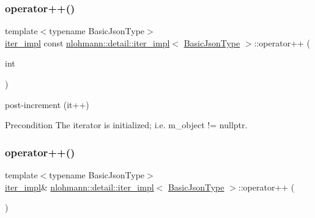 \subsubsection{\texorpdfstring{operator++()}{operator++()}\hspace{0.1cm}{\footnotesize\ttfamily [1/2]}}
{\footnotesize\ttfamily template$<$typename Basic\+Json\+Type$>$ \\
\hyperlink{classnlohmann_1_1detail_1_1iter__impl}{iter\+\_\+impl} const \hyperlink{classnlohmann_1_1detail_1_1iter__impl}{nlohmann\+::detail\+::iter\+\_\+impl}$<$ \hyperlink{classnlohmann_1_1detail_1_1iter__impl_abf18f18793f84b0222aebb5a2a87da7a}{Basic\+Json\+Type} $>$\+::operator++ (\begin{DoxyParamCaption}\item[{int}]{ }\end{DoxyParamCaption})\hspace{0.3cm}{\ttfamily [inline]}}



post-\/increment (it++) 

\begin{DoxyPrecond}{Precondition}
The iterator is initialized; i.\+e. {\ttfamily m\+\_\+object != nullptr}. 
\end{DoxyPrecond}
\mbox{\label{classnlohmann_1_1detail_1_1iter__impl_abdfe2a7f464400a7ab572782d14b922f}} 
\subsubsection{\texorpdfstring{operator++()}{operator++()}\hspace{0.1cm}{\footnotesize\ttfamily [2/2]}}
{\footnotesize\ttfamily template$<$typename Basic\+Json\+Type$>$ \\
\hyperlink{classnlohmann_1_1detail_1_1iter__impl}{iter\+\_\+impl}\& \hyperlink{classnlohmann_1_1detail_1_1iter__impl}{nlohmann\+::detail\+::iter\+\_\+impl}$<$ \hyperlink{classnlohmann_1_1detail_1_1iter__impl_abf18f18793f84b0222aebb5a2a87da7a}{Basic\+Json\+Type} $>$\+::operator++ (\begin{DoxyParamCaption}{ }\end{DoxyParamCaption})\hspace{0.3cm}{\ttfamily [inline]}}




